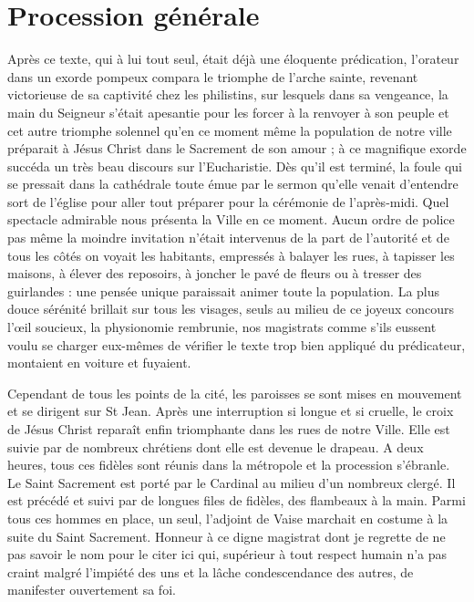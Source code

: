 \documentclass[11pt,a4paper]{report}
\begin{document}
\section*{Procession générale}

Après ce texte, qui à lui tout seul, était déjà une éloquente prédication, l'orateur dans un exorde pompeux compara le triomphe de l'arche sainte, revenant victorieuse de sa captivité chez les philistins, sur lesquels dans sa vengeance, la main du Seigneur s'était apesantie pour les forcer à la renvoyer à son peuple et cet autre triomphe solennel qu'en ce moment même la population de notre ville préparait à Jésus Christ dans le Sacrement de son amour ; à ce magnifique exorde succéda un très beau discours sur l'Eucharistie. Dès qu'il est terminé, la foule qui se pressait dans la cathédrale toute émue par le sermon qu'elle venait d'entendre sort de l'église pour aller tout préparer pour la cérémonie de l'après-midi. Quel spectacle admirable nous présenta la Ville en ce moment. Aucun ordre de police pas même la moindre invitation n'était intervenus de la part de l'autorité et de tous les côtés on voyait les habitants, empressés à balayer les rues, à tapisser les maisons, à élever des reposoirs, à joncher le pavé de fleurs ou à tresser des guirlandes : une pensée unique paraissait animer toute la population. La plus douce sérénité brillait sur tous les visages, seuls au milieu de ce joyeux concours l'œil soucieux, la physionomie rembrunie, nos magistrats comme s'ils eussent voulu se charger eux-mêmes de vérifier le texte trop bien appliqué du prédicateur, montaient en voiture et fuyaient.

Cependant de tous les points de la cité, les paroisses se sont mises en mouvement et se dirigent sur St Jean. Après une interruption si longue et si cruelle, le croix de Jésus Christ reparaît enfin triomphante dans les rues de notre Ville. Elle est suivie par de nombreux chrétiens dont elle est devenue le drapeau. A deux heures, tous ces fidèles sont réunis dans la métropole et la procession s'ébranle. Le Saint Sacrement est porté par le Cardinal au milieu d'un nombreux clergé. Il est précédé et suivi par de longues files de fidèles, des flambeaux à la main. Parmi tous ces hommes en place, un seul, l'adjoint de Vaise marchait en costume à la suite du Saint Sacrement. Honneur à ce digne magistrat dont je regrette de ne pas savoir le nom pour le citer ici qui, supérieur à tout respect humain n'a pas craint malgré l'impiété des uns et la lâche condescendance des autres, de manifester ouvertement sa foi.
\end{document}
